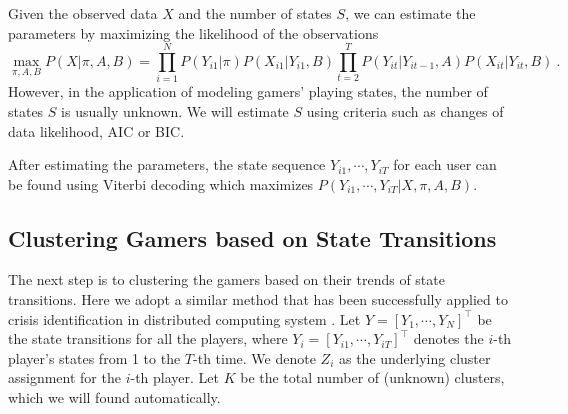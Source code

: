 Given the observed data $X$ and the number of states $S$, we can estimate the parameters by maximizing the 
likelihood of the observations
\[
  \max_{\pi, A, B} P(X | \pi, A, B)
= \prod_{i=1}^N P(Y_{i1} | \pi) P(X_{i1} | Y_{i1}, B)
  \prod_{t=2}^T P(Y_{it} | Y_{i{t-1}}, A) P(X_{it} | Y_{it}, B) ~.
\]
However, in the application of modeling gamers' playing states, the number of states $S$ is usually unknown. 
We will estimate $S$ using criteria such as changes of data likelihood, AIC or BIC. 
 
After estimating the parameters, the state sequence $Y_{i1}, \cdots, Y_{iT}$ 
for each user can be found using Viterbi decoding \cite{hmm} which maximizes
$P(Y_{i1}, \cdots, Y_{iT}| X, \pi, A, B)$. 

\subsection{Clustering Gamers based on State Transitions}
\label{sec:clustering}
The next step is to clustering the gamers based on their trends of state transitions. 
Here we adopt a similar method that has been successfully applied to crisis identification in distributed computing system \cite{moises}. 
Let $Y = [Y_1, \cdots, Y_N]^\top$ be the state transitions for all the players,
where $Y_i = [Y_{i1}, \cdots, Y_{iT}]^\top$ denotes the $i$-th player's states from 1 to
the $T$-th time. We denote $Z_i$ as the underlying cluster assignment for the $i$-th player. 
Let $K$ be the total number of (unknown) clusters, which we will found automatically.

